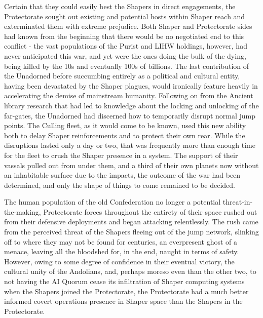 Certain that they could easily best the Shapers in direct engagements,
the Protectorate sought out existing and potential hosts within Shaper
reach and exterminated them with extreme prejudice. Both Shaper and
Protectorate sides had known from the beginning that there would be no
negotiated end to this conflict - the vast populations of the Purist
and LIHW holdings, however, had never anticipated this war, and yet
were the ones doing the bulk of the dying, being killed by the 10s and
eventually 100s of billions. The last contribution of the Unadorned
before succumbing entirely as a political and cultural entity, having
been devastated by the Shaper plagues, would ironically feature
heavily in accelerating the demise of mainstream humanity. Following
on from the Ancient library research that had led to knowledge about
the locking and unlocking of the far-gates, the Unadorned had
discerned how to temporarily disrupt normal jump points. The Culling
fleet, as it would come to be known, used this new ability both to
delay Shaper reinforcements and to protect their own rear. While the
disruptions lasted only a day or two, that was frequently more than
enough time for the fleet to crush the Shaper presence in a
system. The support of their vassals pulled out from under them, and a
third of their own planets now without an inhabitable surface due to
the impacts, the outcome of the war had been determined, and only the
shape of things to come remained to be decided.

The human population of the old Confederation no longer a potential
threat-in-the-making, Protectorate forces throughout the entirety of
their space rushed out from their defensive deployments and began
attacking relentlessly. The rush came from the perceived threat of the
Shapers fleeing out of the jump network, slinking off to where they
may not be found for centuries, an everpresent ghost of a menace,
leaving all the bloodshed for, in the end, naught in terms of
safety. However, owing to some degree of confidence in their eventual
victory, the cultural unity of the Andolians, and, perhaps moreso even
than the other two, to not having the AI Quorum cease its infiltration
of Shaper computing systems when the Shapers joined the Protectorate,
the Protectorate had a much better informed covert operations presence
in Shaper space than the Shapers in the Protectorate.

